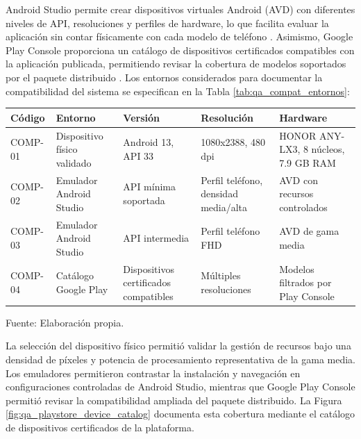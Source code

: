 \begin{enumerate}
Android Studio permite crear dispositivos virtuales Android (AVD) con diferentes niveles de API, resoluciones y perfiles de hardware, lo que facilita evaluar la aplicación sin contar físicamente con cada modelo de teléfono \cite{android_emulator,android_avd}. Asimismo, Google Play Console proporciona un catálogo de dispositivos certificados compatibles con la aplicación publicada, permitiendo revisar la cobertura de modelos soportados por el paquete distribuido \cite{google_play_device_catalog}. Los entornos considerados para documentar la compatibilidad del sistema se especifican en la Tabla \ref{tab:qa_compat_entornos}:

\begin{center}
\begin{minipage}{\linewidth}
\centering
\begin{tabularx}{\linewidth}{@{}p{1.7cm}>{\RaggedRight\arraybackslash}X>{\RaggedRight\arraybackslash}p{2.8cm}>{\RaggedRight\arraybackslash}p{2.5cm}>{\RaggedRight\arraybackslash}p{2.6cm}@{}}
\toprule
Código & Entorno & Versión & Resolución & Hardware \\
\midrule
COMP-01 & Dispositivo físico validado & Android 13, API 33 & 1080x2388, 480 dpi & HONOR ANY-LX3, 8 núcleos, 7.9 GB RAM \\
COMP-02 & Emulador Android Studio & API mínima soportada & Perfil teléfono, densidad media/alta & AVD con recursos controlados \\
COMP-03 & Emulador Android Studio & API intermedia & Perfil teléfono FHD & AVD de gama media \\
COMP-04 & Catálogo Google Play & Dispositivos certificados compatibles & Múltiples resoluciones & Modelos filtrados por Play Console \\
\bottomrule
\end{tabularx}
\label{tab:qa_compat_entornos}
Fuente: Elaboración propia.
\end{minipage}
\end{center}

La selección del dispositivo físico permitió validar la gestión de recursos bajo una densidad de píxeles y potencia de procesamiento representativa de la gama media. Los emuladores permitieron contrastar la instalación y navegación en configuraciones controladas de Android Studio, mientras que Google Play Console permitió revisar la compatibilidad ampliada del paquete distribuido. La Figura \ref{fig:qa_playstore_device_catalog} documenta esta cobertura mediante el catálogo de dispositivos certificados de la plataforma.


\end{enumerate}
